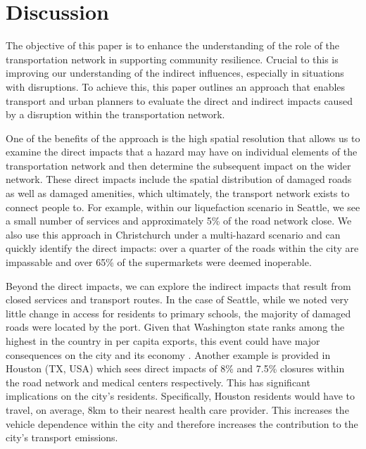 \documentclass[review,3p,times,onecolumn,sort&compress,12pt]{elsarticle}
\let \cite \parencite
\begin{document}
\section{Discussion}

The objective of this paper is to enhance the understanding of the role of the transportation network in supporting community resilience. 
Crucial to this is improving our understanding of the indirect influences, especially in situations with disruptions.
To achieve this, this paper outlines an approach that enables transport and urban planners to evaluate the direct and indirect impacts caused by a disruption within the transportation network.

One of the benefits of the approach is the high spatial resolution that allows us to examine the direct impacts that a hazard may have on individual elements of the transportation network and then determine the subsequent impact on the wider network.
These direct impacts include the spatial distribution of damaged roads as well as damaged amenities, which ultimately, the transport network exists to connect people to.
For example, within our liquefaction scenario in Seattle, we see a small number of services and approximately 5\% of the road network close.
We also use this approach in Christchurch under a multi-hazard scenario and can quickly identify the direct impacts: over a quarter of the roads within the city are impassable and over 65\% of the supermarkets were deemed inoperable.

Beyond the direct impacts, we can explore the indirect impacts that result from closed services and transport routes.
In the case of Seattle, while we noted very little change in access for residents to primary schools, the majority of damaged roads were located by the port.
Given that Washington state ranks among the highest in the country in per capita exports, this event could have major consequences on the city and its economy \cite{McNamee2016-ms}.
Another example is provided in Houston (TX, USA) which sees direct impacts of 8\% and 7.5\% closures within the road network and medical centers respectively.
This has significant implications on the city's residents.
Specifically, Houston residents would have to travel, on average, 8km to their nearest health care provider.
This increases the vehicle dependence within the city and therefore increases the contribution to the city's transport emissions.
\end{document}

